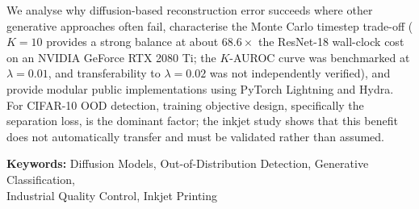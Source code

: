 \begin{abstract*}
We analyse why diffusion-based reconstruction error succeeds where other generative approaches often fail, characterise the Monte Carlo timestep trade-off ($K=10$ provides a strong balance at about $68.6\times$ the ResNet-18 wall-clock cost on an NVIDIA GeForce RTX 2080 Ti; the $K$-AUROC curve was benchmarked at $\lambda=0.01$, and transferability to $\lambda=0.02$ was not independently verified), and provide modular public implementations using PyTorch Lightning and Hydra. For CIFAR-10 OOD detection, training objective design, specifically the separation loss, is the dominant factor; the inkjet study shows that this benefit does not automatically transfer and must be validated rather than assumed.

\vspace{0.08cm}
\noindent\textbf{Keywords:} Diffusion Models, Out-of-Distribution Detection, Generative Classification,\\
Industrial Quality Control, Inkjet Printing
\endgroup
\end{abstract*}
